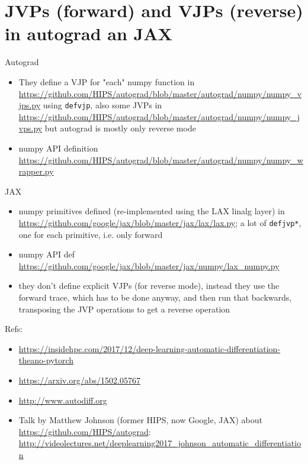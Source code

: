 \documentclass[paper=a4,11pt,headsepline]{scrartcl}
\begin{document}
\section*{JVPs (forward) and VJPs (reverse) in autograd an JAX}

Autograd

\begin{itemize}
    \item They define a VJP for "each" numpy function in
        \url{https://github.com/HIPS/autograd/blob/master/autograd/numpy/numpy_vjps.py}
        using \texttt{defvjp}, also some JVPs in
        \url{https://github.com/HIPS/autograd/blob/master/autograd/numpy/numpy_jvps.py}
        but autograd is mostly only reverse mode
    \item numpy API definition
        \url{https://github.com/HIPS/autograd/blob/master/autograd/numpy/numpy_wrapper.py}
\end{itemize}

JAX

\begin{itemize}
    \item numpy primitives defined (re-implemented using the LAX linalg layer) in
        \url{https://github.com/google/jax/blob/master/jax/lax/lax.py};
        a lot of \texttt{defjvp*}, one for each primitive, i.e. only forward
    \item numpy API def
        \url{https://github.com/google/jax/blob/master/jax/numpy/lax_numpy.py}
    \item they don't define explicit VJPs (for reverse mode), instead they use
        the forward trace, which has to be done anyway, and then run that
        backwards, transposing the JVP operations to get a reverse operation
\end{itemize}

Refs:

\begin{itemize}
    \item \url{https://insidehpc.com/2017/12/deep-learning-automatic-differentiation-theano-pytorch}
    \item \url{https://arxiv.org/abs/1502.05767}
    \item \url{http://www.autodiff.org}
    \item Talk by Matthew Johnson (former HIPS, now Google, JAX) about
        \url{https://github.com/HIPS/autograd}:
        \url{http://videolectures.net/deeplearning2017_johnson_automatic_differentiation}
\end{itemize}
\end{document}
